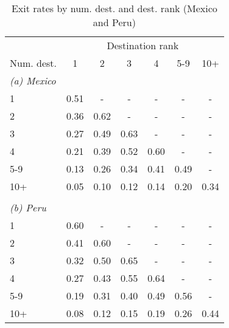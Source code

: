 \begin{table}[h!]
\footnotesize
\renewcommand{\arraystretch}{1.2}
\begin{center}
\begin{threeparttable}\caption{Exit rates by num. dest. and dest. rank (Mexico and Peru)}
\label{tab:exit_by_nd_drank_wbedd}
\begin{tabular}{lcccccc}
\toprule
&\multicolumn{6}{c}{Destination rank}\\
\cmidrule(rl){2-7}
Num. dest.&1&2&3&4&5-9&10+\\
\midrule
\multicolumn{7}{l}{\textit{(a) Mexico}}\\
1& 0.51& -& -& -& -& -\\
2& 0.36& 0.62& -& -& -& -\\
3& 0.27& 0.49& 0.63& -& -& -\\
4& 0.21& 0.39& 0.52& 0.60& -& -\\
5-9& 0.13& 0.26& 0.34& 0.41& 0.49& -\\
10+& 0.05& 0.10& 0.12& 0.14& 0.20& 0.34\\
\\
\multicolumn{7}{l}{\textit{(b) Peru}}\\
1& 0.60& -& -& -& -& -\\
2& 0.41& 0.60& -& -& -& -\\
3& 0.32& 0.50& 0.65& -& -& -\\
4& 0.27& 0.43& 0.55& 0.64& -& -\\
5-9& 0.19& 0.31& 0.40& 0.49& 0.56& -\\
10+& 0.08& 0.12& 0.15& 0.19& 0.26& 0.44\\
\bottomrule
\end{tabular}
\end{threeparttable}
\end{center}
\normalsize
\end{table}
